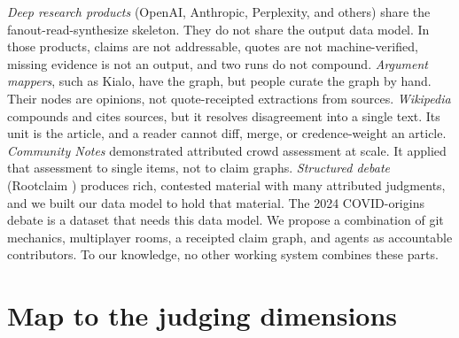 \documentclass[10pt,twocolumn]{article}
\begin{document}
\emph{Deep research products} (OpenAI, Anthropic, Perplexity, and others)
share the fanout-read-synthesize skeleton. They do not share the output
data model. In those products, claims are not addressable, quotes are not
machine-verified, missing evidence is not an output, and two runs do not
compound. \emph{Argument mappers}, such as Kialo, have the graph, but
people curate the graph by hand. Their nodes are opinions, not
quote-receipted extractions from sources. \emph{Wikipedia} compounds and
cites sources, but it resolves disagreement into a single text. Its unit
is the article, and a reader cannot diff, merge, or credence-weight an
article. \emph{Community Notes} \cite{communitynotes} demonstrated
attributed crowd assessment at scale. It applied that assessment to
single items, not to claim graphs. \emph{Structured debate} (Rootclaim
\cite{rootclaim}) produces rich, contested material with many attributed
judgments, and we built our data model to hold that material. The 2024
COVID-origins debate is a dataset that needs this data model. We propose
a combination of git mechanics, multiplayer rooms, a receipted claim
graph, and agents as accountable contributors. To our knowledge, no other
working system combines these parts.
\section{Map to the judging dimensions}
\end{document}
